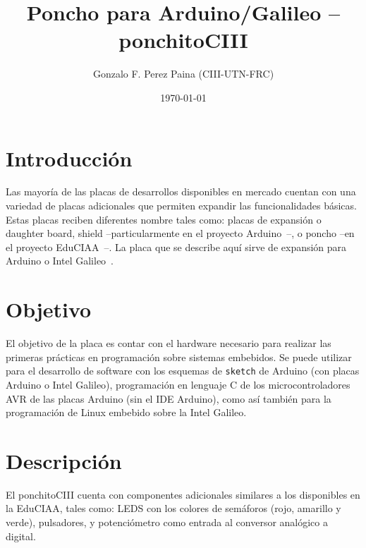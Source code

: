 \documentclass[a4paper]{article}
\title{Poncho para Arduino/Galileo -- ponchitoCIII}
\author{Gonzalo F. Perez Paina (CIII-UTN-FRC)}
\date{\today}
\begin{document}
\maketitle

\section{Introducción}
Las mayoría de las placas de desarrollos disponibles en mercado cuentan con una variedad de placas adicionales que permiten expandir las funcionalidades básicas.
Estas placas reciben diferentes nombre tales como: placas de expansión o daughter board, shield --particularmente en el proyecto Arduino~\cite{Arduino}--, o poncho --en el proyecto EduCIAA~\cite{EduCIAA}--.
La placa que se describe aquí sirve de expansión para Arduino o Intel Galileo~\cite{Galileo}. 

\section{Objetivo}

El objetivo de la placa es contar con el hardware necesario para realizar las primeras prácticas en programación sobre sistemas embebidos. 
Se puede utilizar para el desarrollo de software con los esquemas de \texttt{sketch} de Arduino (con placas Arduino o Intel Galileo), programación en lenguaje C de los microcontroladores AVR de las placas Arduino (sin el IDE Arduino), como así también para la programación de Linux embebido sobre la Intel Galileo.

\section{Descripción}
El ponchitoCIII cuenta con componentes adicionales similares a los disponibles en la EduCIAA, tales como: LEDS con los colores de semáforos (rojo, amarillo y verde), pulsadores, y potenciómetro como entrada al conversor analógico a digital.
\end{document}
